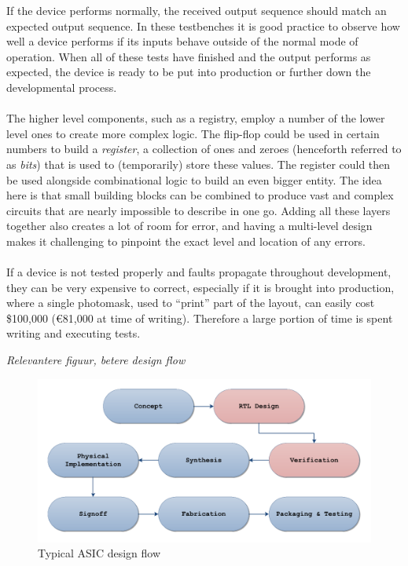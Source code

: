 \documentclass[11pt,british]{article}
\begin{document}
If the device performs normally, the received output sequence should match an expected output sequence. In these testbenches it is good practice to observe how well a device performs if its inputs behave outside of the normal mode of operation. When all of these tests have finished and the output performs as expected, the device is ready to be put into production or further down the developmental process.
\\
\\
The higher level components, such as a registry, employ a number of the lower level ones to create more complex logic. The flip-flop could be used in certain numbers to build a \emph{register}, a collection of ones and zeroes (henceforth referred to as \emph{bits}) that is used to (temporarily) store these values. The register could then be used alongside combinational logic to build an even bigger entity. The idea here is that small building blocks can be combined to produce vast and complex circuits that are nearly impossible to describe in one go. Adding all these layers together also creates a lot of room for error, and having a multi-level design makes it challenging to pinpoint the exact level and location of any errors. 
\\
\\
If a device is not tested properly and faults propagate throughout development, they can be very expensive to correct, especially if it is brought into production, where a single photomask, used to ``print'' part of the layout, can easily cost \$100,000 (\euro81,000 at time of writing)\cite{weber06}. Therefore a large portion of time is spent writing and executing tests.

\emph{\color{red}Relevantere figuur, betere design flow}\\
\begin{figure}[h]
    \centering
	\includegraphics[width=\textwidth]{images/VHDLflow.pdf}
    \caption{Typical ASIC design flow}
    \label{fig:Design_Flow}
\end{figure}
\end{document}
